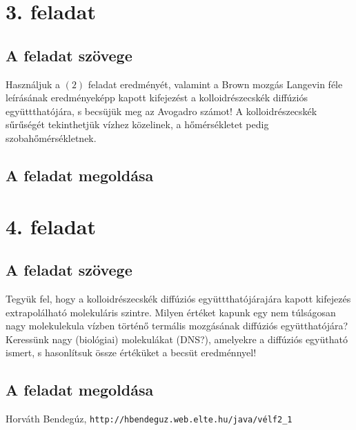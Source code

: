 \documentclass[12pt]{article}
\begin{document}
\section*{3. feladat} 
\subsection*{ A feladat szövege}
Használjuk a $(2)$ feladat eredményét, valamint a Brown mozgás Langevin féle leírásának eredményeképp
kapott kifejezést a kolloidrészecskék diffúziós együttthatójára, s becsüjük meg az Avogadro számot! A kolloidrészecskék sűrűségét tekinthetjük vízhez közelinek, a hőmérsékletet pedig szobahőmérsékletnek.

 
 \subsection*{A feladat megoldása}

\newpage
\section*{4. feladat}
\subsection*{ A feladat szövege}
Tegyük fel, hogy a kolloidrészecskék diffúziós együttthatójárajára kapott kifejezés extrapolálható molekuláris
szintre. Milyen értéket kapunk egy nem túlságosan nagy molekulekula vízben történő termális mozgásának diffúziós együtthatójára? Keressünk nagy (biológiai) molekulákat (DNS?), amelyekre a diffúziós együtható ismert, s hasonlítsuk össze értéküket a becsüt eredménnyel!

 
 \subsection*{A feladat megoldása}






\begin{thebibliography}{9}
Horváth Bendegúz, 
\texttt{http://hbendeguz.web.elte.hu/java/vélf2\_{}1}

\end{thebibliography}
\end{document}
